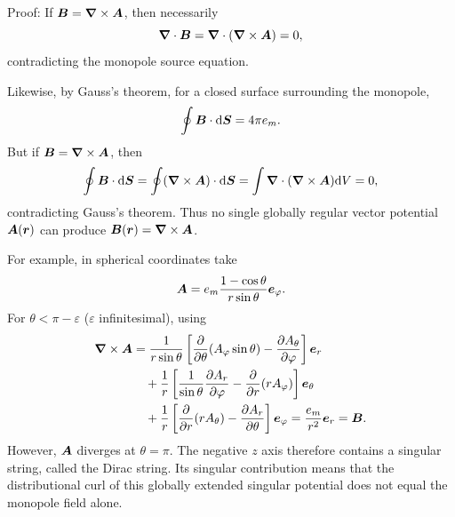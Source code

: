 Proof: If $\bm{B}=\bm{\nabla}\times\bm{A}$, then necessarily
\begin{equation}
\bm{\nabla}\cdot\bm{B}=\bm{\nabla}\cdot(\bm{\nabla}\times\bm{A})=0,
\end{equation}
contradicting the monopole source equation.

Likewise, by Gauss's theorem, for a closed surface surrounding the monopole,
\begin{equation}
\oint\bm{B}\cdot\mathrm{d}\bm{S}=4\pi e_m.
\end{equation}
But if $\bm{B}=\bm{\nabla}\times\bm{A}$, then
\begin{equation}
\oint\bm{B}\cdot\mathrm{d}\bm{S}
=\oint(\bm{\nabla}\times\bm{A})\cdot\mathrm{d}\bm{S}
=\int\bm{\nabla}\cdot(\bm{\nabla}\times\bm{A})\mathrm{d} V=0,
\end{equation}
contradicting Gauss's theorem. Thus no single globally regular vector potential $\bm{A}(\bm{r})$ can produce $\bm{B}(\bm{r})=\bm{\nabla}\times\bm{A}$.

For example, in spherical coordinates take
\begin{equation}
\bm{A}=e_m\frac{1-\cos\theta}{r\sin\theta}\bm{e}_\varphi.
\end{equation}
For $\theta<\pi-\varepsilon$ ($\varepsilon$ infinitesimal), using
\begin{equation}
\begin{split}
\bm{\nabla}\times\bm{A}
&=\frac1{r\sin\theta}\left[
\frac{\partial}{\partial\theta}(A_\varphi\sin\theta)
-\frac{\partial A_\theta}{\partial\varphi}\right]\bm{e}_r\\
&\quad+\frac1r\left[
\frac1{\sin\theta}\frac{\partial A_r}{\partial\varphi}
-\frac{\partial}{\partial r}(rA_\varphi)\right]\bm{e}_\theta\\
&\quad+\frac1r\left[
\frac{\partial}{\partial r}(rA_\theta)
-\frac{\partial A_r}{\partial\theta}\right]\bm{e}_\varphi
=\frac{e_m}{r^2}\bm{e}_r=\bm{B}.
\end{split}
\end{equation}
However, $\bm{A}$ diverges at $\theta=\pi$. The negative $z$ axis therefore contains a singular string, called the Dirac string. Its singular contribution means that the distributional curl of this globally extended singular potential does not equal the monopole field alone.

